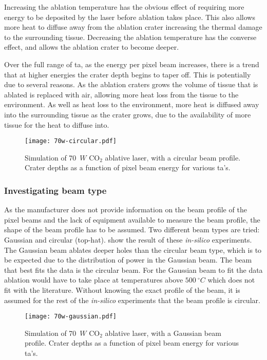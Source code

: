 Increasing the ablation temperature has the obvious effect of requiring more energy to be deposited by the laser before ablation takes place. This also allows more heat to diffuse away from the ablation crater increasing the thermal damage to the surrounding tissue. Decreasing the ablation temperature has the converse effect, and allows the ablation crater to become deeper.

Over the full range of \gls*{ta}, as the energy per pixel beam increases, there is a trend that at higher energies the crater depth begins to taper off. This is potentially due to several reasons. As the ablation craters grows the volume of tissue that is ablated is replaced with air, allowing more heat loss from the tissue to the environment. As well as heat loss to the environment, more heat is diffused away into the surrounding tissue as the crater grows, due to the availability of more tissue for the heat to diffuse into.


\begin{figure}[!htbp]
	\centering
    \texttt{[image: 70w-circular.pdf]}
    \caption{Simulation of 70~$W$ CO$_2$ ablative laser, with a circular beam profile. Crater depths as a function of pixel beam energy for various \gls*{ta}'s.}
    \label{fig:tacirc}
\end{figure}
 


\subsubsection*{Investigating beam type}

As the manufacturer does not provide information on the beam profile of the pixel beams and the lack of equipment available to measure the beam profile, the shape of the beam profile has to be assumed. Two different beam types are tried: Gaussian and circular (top-hat).  show the result of these \textit{in-silico} experiments. The Gaussian beam ablates deeper holes than the circular beam type, which is to be expected due to the distribution of power in the Gaussian beam. The beam that best fits the data is the circular beam. For the Gaussian beam to fit the data ablation would have to take place at temperatures above $500~^{\circ}C$ which does not fit with the literature. Without knowing the exact profile of the beam, it is assumed for the rest of the \textit{in-silico} experiments that the beam profile is circular.

 \begin{figure}[!htbp]
	\centering
    \texttt{[image: 70w-gaussian.pdf]}
    \caption{Simulation of 70~$W$ CO$_2$ ablative laser, with a Gaussian beam profile. Crater depths as a function of pixel beam energy for various \gls*{ta}'s.}
    \label{fig:tagauss}
\end{figure}

